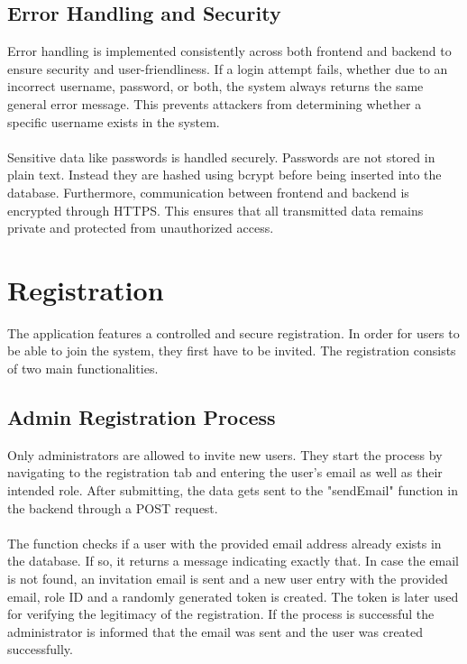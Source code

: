 \documentclass[a4paper,12pt]{report}
\begin{document}
\subsection{Error Handling and Security}
Error handling is implemented consistently across both frontend and backend to ensure security and user-friendliness. If a login attempt fails, whether due to an incorrect username, password, or both, the system always returns the same general error message. This prevents attackers from determining whether a specific username exists in the system.\\\\
Sensitive data like passwords is handled securely. Passwords are not stored in plain text. Instead they are hashed using bcrypt before being inserted into the database. Furthermore, communication between frontend and backend is encrypted through HTTPS. This ensures that all transmitted data remains private and protected from unauthorized access.

\section{Registration}
The application features a controlled and secure registration. In order for users to be able to join the system, they first have to be invited. The registration consists of two main functionalities.
\subsection{Admin Registration Process}
Only administrators are allowed to invite new users. They start the process by navigating to the registration tab and entering the user's email as well as their intended role. After submitting, the data gets sent to the "sendEmail" function in the backend through a POST request.\\\\
The function checks if a user with the provided email address already exists in the database. If so, it returns a message indicating exactly that. In case the email is not found, an invitation email is sent and a new user entry with the provided email, role ID and a randomly generated token is created. The token is later used for verifying the legitimacy of the registration. If the process is successful the administrator is informed that the email was sent and the user was created successfully.
\end{document}
